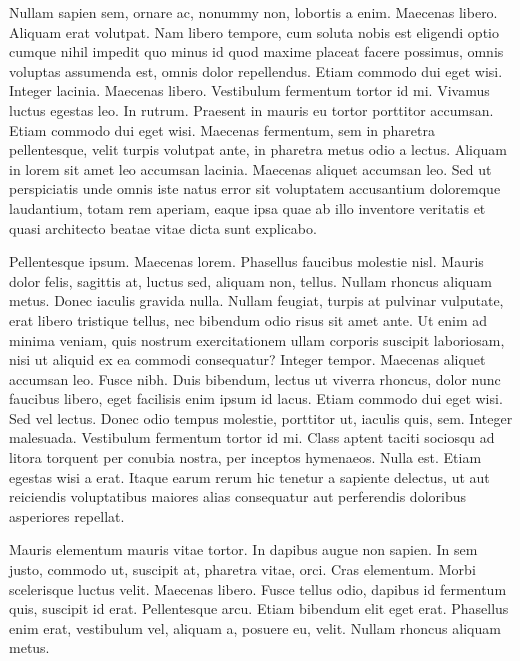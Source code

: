 Nullam sapien sem, ornare ac, nonummy non, lobortis a enim. Maecenas libero. Aliquam erat volutpat. Nam libero tempore, cum soluta nobis est eligendi optio cumque nihil impedit quo minus id quod maxime placeat facere possimus, omnis voluptas assumenda est, omnis dolor repellendus. Etiam commodo dui eget wisi. Integer lacinia. Maecenas libero. Vestibulum fermentum tortor id mi. Vivamus luctus egestas leo. In rutrum. Praesent in mauris eu tortor porttitor accumsan. Etiam commodo dui eget wisi. Maecenas fermentum, sem in pharetra pellentesque, velit turpis volutpat ante, in pharetra metus odio a lectus. Aliquam in lorem sit amet leo accumsan lacinia. Maecenas aliquet accumsan leo. Sed ut perspiciatis unde omnis iste natus error sit voluptatem accusantium doloremque laudantium, totam rem aperiam, eaque ipsa quae ab illo inventore veritatis et quasi architecto beatae vitae dicta sunt explicabo.

Pellentesque ipsum. Maecenas lorem. Phasellus faucibus molestie nisl. Mauris dolor felis, sagittis at, luctus sed, aliquam non, tellus. Nullam rhoncus aliquam metus. Donec iaculis gravida nulla. Nullam feugiat, turpis at pulvinar vulputate, erat libero tristique tellus, nec bibendum odio risus sit amet ante. Ut enim ad minima veniam, quis nostrum exercitationem ullam corporis suscipit laboriosam, nisi ut aliquid ex ea commodi consequatur? Integer tempor. Maecenas aliquet accumsan leo. Fusce nibh. Duis bibendum, lectus ut viverra rhoncus, dolor nunc faucibus libero, eget facilisis enim ipsum id lacus. Etiam commodo dui eget wisi. Sed vel lectus. Donec odio tempus molestie, porttitor ut, iaculis quis, sem. Integer malesuada. Vestibulum fermentum tortor id mi. Class aptent taciti sociosqu ad litora torquent per conubia nostra, per inceptos hymenaeos. Nulla est. Etiam egestas wisi a erat. Itaque earum rerum hic tenetur a sapiente delectus, ut aut reiciendis voluptatibus maiores alias consequatur aut perferendis doloribus asperiores repellat.

Mauris elementum mauris vitae tortor. In dapibus augue non sapien. In sem justo, commodo ut, suscipit at, pharetra vitae, orci. Cras elementum. Morbi scelerisque luctus velit. Maecenas libero. Fusce tellus odio, dapibus id fermentum quis, suscipit id erat. Pellentesque arcu. Etiam bibendum elit eget erat. Phasellus enim erat, vestibulum vel, aliquam a, posuere eu, velit. Nullam rhoncus aliquam metus.

